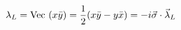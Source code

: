 \begin{equation}
\lambda_{L}= {\rm Vec}~(x \bar{y}) = \frac{1}{2}(x \bar{y}-y \bar{x}) = -i\vec{\sigma}\cdot
\vec{\lambda}_{L}
\end{equation}

